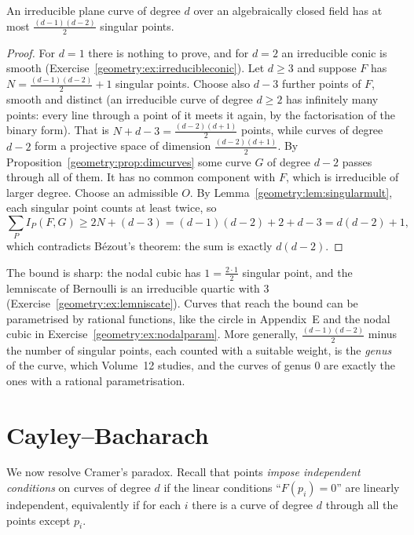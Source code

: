 \begin{theorem}\label{geometry:thm:singbound}
An irreducible plane curve of degree $d$ over an algebraically closed field has at most $\frac{(d-1)(d-2)}2$ singular points.
\end{theorem}

\begin{proof}
For $d=1$ there is nothing to prove, and for $d=2$ an irreducible conic is smooth (Exercise~\ref{geometry:ex:irreducibleconic}). Let $d\ge3$ and suppose $F$ has
$N=\frac{(d-1)(d-2)}2+1$ singular points. Choose also $d-3$ further points of $F$, smooth and distinct (an irreducible curve of degree $d\ge2$ has
infinitely many points: every line through a point of it meets it again, by the factorisation of the binary form). That is
$N+d-3=\frac{(d-2)(d+1)}2$ points, while curves of degree $d-2$ form a projective space of dimension $\frac{(d-2)(d+1)}2$. By
Proposition~\ref{geometry:prop:dimcurves} some curve $G$ of degree $d-2$ passes through all of them. It has no common component with $F$, which is irreducible of
larger degree. Choose an admissible $O$. By Lemma~\ref{geometry:lem:singularmult}, each singular point counts at least twice, so
\[
\sum_PI_P(F,G)\ge2N+(d-3)=(d-1)(d-2)+2+d-3=d(d-2)+1,
\]
which contradicts B\'ezout's theorem: the sum is exactly $d(d-2)$.
\end{proof}

The bound is sharp: the nodal cubic has $1=\frac{2\cdot1}2$ singular point, and the lemniscate of Bernoulli is an irreducible quartic with $3$
(Exercise~\ref{geometry:ex:lemniscate}). Curves that reach the bound can be parametrised by rational functions, like the circle in
Appendix~E and the nodal cubic in Exercise~\ref{geometry:ex:nodalparam}. More generally, $\frac{(d-1)(d-2)}2$ minus the number of singular points, each counted with a
suitable weight, is the \emph{genus} of the curve, which Volume~12 studies, and the curves of genus $0$ are exactly the ones with a rational parametrisation.

\section{Cayley--Bacharach}

We now resolve Cramer's paradox. Recall that points \emph{impose independent conditions} on curves of degree $d$ if the linear conditions ``$F(p_i)=0$''
are linearly independent, equivalently if for each $i$ there is a curve of degree $d$ through all the points except $p_i$.

